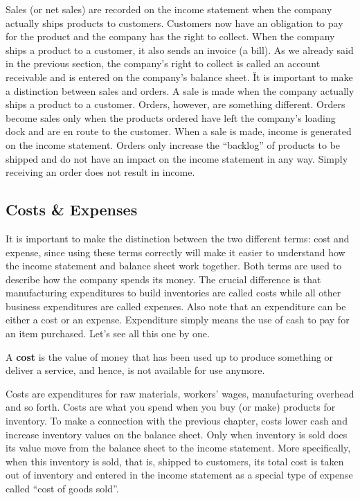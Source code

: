 Sales (or net sales) are recorded on the income statement when the company actually ships products to customers.
Customers now have an obligation to pay for the product and the company has the right to collect. When the company
ships a product to a customer, it also sends an invoice (a bill). As we already said in the previous section, the
company's right to collect is called an account receivable and is entered on the company's balance sheet. \v

It is important to make a distinction between sales and orders. A sale is made when the company actually ships a
product to a customer. Orders, however, are something different. Orders become sales only when the products ordered
have left the company's loading dock and are en route to the customer. When a sale is made, income is generated on
the income statement. Orders only increase the ``backlog'' of products to be shipped and do not have an impact on the
income statement in any way. Simply receiving an order does not result in income.

\subsection{Costs \& Expenses}

It is important to make the distinction between the two different terms: cost and expense, since using these terms
correctly will make it easier to understand how the income statement and balance sheet work together. Both terms are
used to describe how the company spends its money. The crucial difference is that manufacturing expenditures to build
inventories are called costs while all other business expenditures are called expenses. Also note that an expenditure
can be either a cost or an expense. Expenditure simply means the use of cash to pay for an item purchased. Let's see
all this one by one.

\bd[Cost]
A \textbf{cost} is the value of money that has been used up to produce something or deliver a service, and hence, is not
available for use anymore.
\ed

Costs are expenditures for raw materials, workers' wages, manufacturing overhead and so forth. Costs are what you
spend when you buy (or make) products for inventory. To make a connection with the previous chapter, costs lower cash
and increase inventory values on the balance sheet. Only when inventory is sold does its value move from the balance
sheet to the income statement. More specifically, when this inventory is sold, that is, shipped to customers, its
total cost is taken out of inventory and entered in the income statement as a special type of expense called ``cost
of goods sold''.

